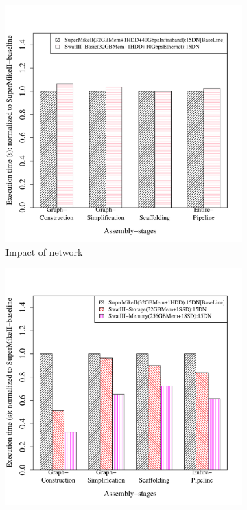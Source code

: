 \documentclass[conference]{IEEEtran}
\begin{document}
\begin{figure}[htb]
	\begin{subfigure}[b]{0.5\textwidth}
                \includegraphics[width=\textwidth, height=.3\textheight]{Figure/PerormanceData/Plots/Network.pdf}
                \caption{Impact of network}
                \label{fig:SuperMikeSwatBasic}
        \end{subfigure}
 	\begin{subfigure}[b]{0.5\textwidth}
                \includegraphics[width=\textwidth, height=.3\textheight]{Figure/PerormanceData/Plots/StorageMemory.pdf}

\end{subfigure}
\end{figure}
\end{document}
